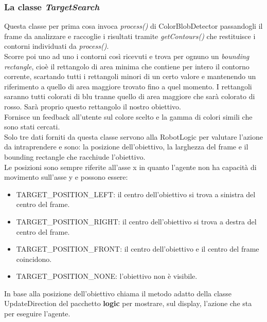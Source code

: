 \subsubsection{La classe \emph{TargetSearch}}
Questa classe per prima cosa invoca \emph{process()} di ColorBlobDetector passandogli
il frame da analizzare e raccoglie i risultati tramite \emph{getContours()} che restituisce 
i contorni individuati da \emph{process()}.\\
Scorre poi uno ad uno i contorni così ricevuti e trova per ognuno un \emph{bounding rectangle}, 
cioè il rettangolo di area minima che contiene per intero il contorno corrente, 
scartando tutti i rettangoli minori di un certo valore e mantenendo un riferimento 
a quello di area maggiore trovato fino a quel momento. I rettangoli saranno tutti colorati di blu
tranne quello di area maggiore che sarà colorato di rosso. Sarà proprio questo 
rettangolo il nostro obiettivo.\\
Fornisce un feedback all'utente sul colore scelto e la gamma di colori simili 
che sono stati cercati.\\
Solo tre dati forniti da questa classe servono alla RobotLogic per valutare l'azione 
da intraprendere e sono:
la posizione dell'obiettivo, la larghezza del frame e il bounding rectangle 
che racchiude l'obiettivo.\\
Le posizioni sono sempre riferite all'asse x in quanto l'agente non 
ha capacità di movimento sull'asse y e possono essere:
\begin{itemize}
	\item TARGET\_POSITION\_LEFT: il centro dell'obiettivo si trova a sinistra del centro del frame. 
	\item TARGET\_POSITION\_RIGHT: il centro dell'obiettivo si trova a destra del centro del frame. 
	\item TARGET\_POSITION\_FRONT: il centro dell'obiettivo e il centro del frame coincidono. 
	\item TARGET\_POSITION\_NONE: l'obiettivo non è visibile.
\end{itemize}
In base alla posizione dell'obiettivo chiama il metodo adatto della classe UpdateDirection del pacchetto \textbf{logic}
per mostrare, sul display, l'azione che sta per eseguire l'agente.


